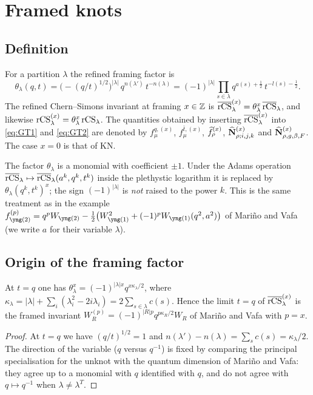 \section{Framed knots}\label{sec:framing}

\subsection{Definition}
\begin{definition}\label{def:framed}
For a partition $\lambda$ the refined framing factor is
\[
\theta_\lambda(q,t)=\bigl(-(q/t)^{1/2}\bigr)^{|\lambda|}\,q^{n(\lambda')}\,t^{-n(\lambda)}
=(-1)^{|\lambda|}\prod_{s\in\lambda}q^{a(s)+\frac12}\,t^{-l(s)-\frac12} .
\]
The refined Chern--Simons invariant at framing $x\in\mathbb{Z}$ is $\overline{\mathrm{rCS}}^{(x)}_\lambda=\theta_\lambda^x\,\overline{\mathrm{rCS}}_\lambda$, and likewise $\mathrm{rCS}^{(x)}_\lambda=\theta_\lambda^x\,\mathrm{rCS}_\lambda$.
The quantities obtained by inserting $\overline{\mathrm{rCS}}^{(x)}_\lambda$ into \eqref{eq:GT1} and \eqref{eq:GT2} are denoted by
$f^{q,(x)}_\mu$, $f^{\bar t,(x)}_\mu$, $\widehat{f}^{(x)}_\rho$, $\widehat{\mathbf{N}}^{(x)}_{\rho;i,j,k}$ and $\widehat{\mathbf{N}}^{(x)}_{\rho,g,\beta,F}$.
The case $x=0$ is that of KN.
\end{definition}

The factor $\theta_\lambda$ is a monomial with coefficient $\pm1$.
Under the Adams operation $\overline{\mathrm{rCS}}_\lambda\mapsto\overline{\mathrm{rCS}}_\lambda(a^k,q^k,t^k)$ inside the plethystic logarithm it is replaced by $\theta_\lambda(q^k,t^k)^x$; the sign $(-1)^{|\lambda|}$ is \emph{not} raised to the power $k$.
This is the same treatment as in the example
$f^{(p)}_{\yng(2)}=q^pW_{\yng(2)}-\tfrac12\bigl(W_{\yng(1)}^2+(-1)^pW_{\yng(1)}(q^2,a^2)\bigr)$ of Mari\~no and Vafa \cite{Marino01}
(we write $a$ for their variable $\lambda$).

\subsection{Origin of the framing factor}
\begin{proposition}\label{prop:MV}
At $t=q$ one has $\theta_\lambda^x=(-1)^{|\lambda|x}q^{x\kappa_\lambda/2}$, where $\kappa_\lambda=|\lambda|+\sum_i(\lambda_i^2-2i\lambda_i)=2\sum_{s\in\lambda}c(s)$.
Hence the limit $t=q$ of $\overline{\mathrm{rCS}}^{(x)}_\lambda$ is the framed invariant $W^{(p)}_R=(-1)^{|R|p}q^{p\kappa_R/2}W_R$ of Mari\~no and Vafa \cite{Marino01} with $p=x$.
\end{proposition}
\begin{proof}
At $t=q$ we have $(q/t)^{1/2}=1$ and $n(\lambda')-n(\lambda)=\sum_s c(s)=\kappa_\lambda/2$.
The direction of the variable ($q$ versus $q^{-1}$) is fixed by comparing the principal specialisation for the unknot with the quantum dimension of Mari\~no and Vafa:
they agree up to a monomial with $q$ identified with $q$, and do not agree with $q\mapsto q^{-1}$ when $\lambda\neq\lambda^T$.
\end{proof}

